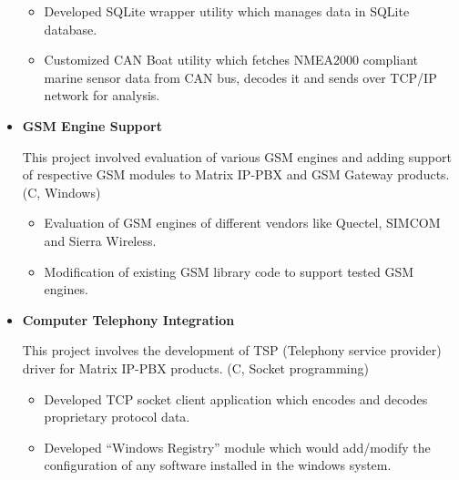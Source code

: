 \documentclass[letterpaper,10pt]{article}
\newcommand{\resitem}[1]{\item #1 \vspace{-2pt}}
\begin{document}
\begin{itemize}
\begin{itemize}
	    \resitem{Developed SQLite wrapper utility which manages data in SQLite database.}
	    
	    \resitem{Customized CAN Boat utility which fetches NMEA2000 compliant marine sensor data from CAN bus, decodes it and sends over TCP/IP network for analysis.}

	\end{itemize}
	
\item
	\textbf{GSM Engine Support}
	
	This project involved evaluation of various GSM engines and adding support of respective GSM modules to Matrix IP-PBX and GSM Gateway products. (C, Windows)
	
	\begin{itemize}
	    \resitem{Evaluation of GSM engines of different vendors like Quectel, SIMCOM and Sierra Wireless.}
	    
	    \resitem{Modification of existing GSM library code to support tested GSM engines.}
	
	\end{itemize}
	
\item
   \textbf{Computer Telephony Integration}
    
    This project involves the development of TSP (Telephony service provider) driver for Matrix IP-PBX products. (C, Socket programming)
    
	\begin{itemize}
	    \resitem{Developed TCP socket client application which encodes and decodes proprietary protocol data.}
	    
	    \resitem{Developed “Windows Registry” module which would add/modify the configuration of any software installed in the windows system.}
	    
	\end{itemize}

\end{itemize}
\end{document}
